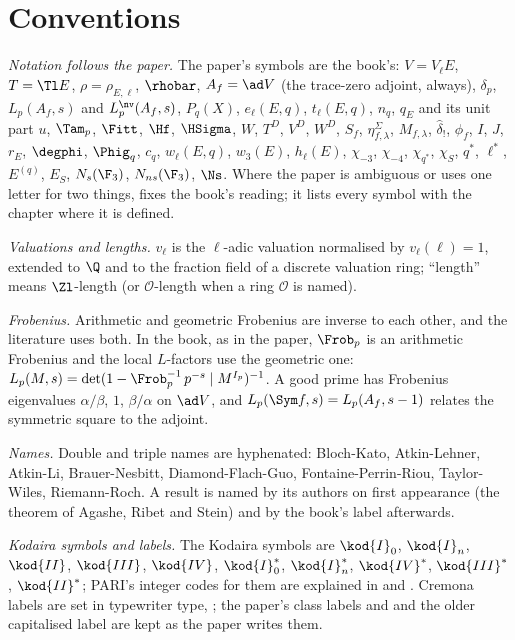 \section*{Conventions}

\emph{Notation follows the paper.} The paper's symbols are the book's: $V=V_\ell E$, $T=\Tl E$,
$\rho=\rho_{E,\ell}$, $\rhobar$, $A_f=\ad V$ (the trace-zero adjoint, always), $\delta_p$,
$L_p(A_f,s)$ and $L_p^{\nv}(A_f,s)$, $P_q(X)$, $e_\ell(E,q)$, $t_\ell(E,q)$, $n_q$, $q_E$ and its
unit part $u$, $\Tam_p$, $\Fitt$, $\Hf$, $\HSigma$, $W$, $T^D$, $V^D$, $W^D$, $S_f$,
$\eta^\Sigma_{f,\lambda}$, $M_{f,\lambda}$, $\hat\delta_!$, $\phi_f$, $I$, $J$, $r_E$, $\degphi$,
$\Phig_q$, $c_q$, $w_\ell(E,q)$, $w_3(E)$, $h_\ell(E)$, $\chi_{-3}$, $\chi_{-4}$, $\chi_{q^*}$,
$\chi_S$, $q^*$, $\ell^*$, $E^{(q)}$, $E_S$, $N_s(\F_3)$, $N_{ns}(\F_3)$, $\Ns$. Where the paper is
ambiguous or uses one letter for two things,  fixes the book's reading; it lists
every symbol with the chapter where it is defined.

\emph{Valuations and lengths.} $v_\ell$ is the $\ell$-adic valuation normalised by $v_\ell(\ell)=1$,
extended to $\Q$ and to the fraction field of a discrete valuation ring; ``length'' means
$\Zl$-length (or $\mathcal{O}$-length when a ring $\mathcal{O}$ is named).

\emph{Frobenius.} Arithmetic and geometric Frobenius are inverse to each other, and the literature
uses both. In the book, as in the paper, $\Frob_p$ is an arithmetic Frobenius and the
local $L$-factors use the geometric one:
$L_p(M,s)=\det(1-\Frob_p^{-1}\,p^{-s}\mid M^{I_p})^{-1}$. A good prime has Frobenius eigenvalues
$\alpha/\beta$, $1$, $\beta/\alpha$ on $\ad V$, and $L_p(\Sym f,s)=L_p(A_f,s-1)$ relates the
symmetric square to the adjoint.

\emph{Names.} Double and triple names are hyphenated: Bloch-Kato, Atkin-Lehner, Atkin-Li,
Brauer-Nesbitt, Diamond-Flach-Guo, Fontaine-Perrin-Riou, Taylor-Wiles, Riemann-Roch. A result is
named by its authors on first appearance (the theorem of Agashe, Ribet and Stein) and by the
book's label afterwards.

\emph{Kodaira symbols and labels.} The Kodaira symbols are $\kod{I}_0$, $\kod{I}_n$, $\kod{II}$,
$\kod{III}$, $\kod{IV}$, $\kod{I}_0^*$, $\kod{I}_n^*$, $\kod{IV}^*$, $\kod{III}^*$, $\kod{II}^*$;
PARI's integer codes for them are explained in  and .
Cremona labels are set in typewriter type, ; the paper's class labels 
and  and the older capitalised label  are kept as the paper writes them.


